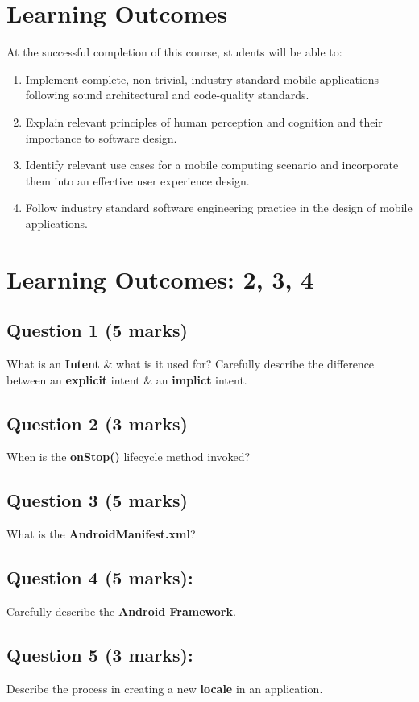 \documentclass{article}
\begin{document}
\section*{Learning Outcomes}
At the successful completion of this course, students will be able to:
\begin{enumerate}
	\item Implement complete, non-trivial, industry-standard mobile applications following sound architectural and code-quality standards.
	\item Explain relevant principles of human perception and cognition and their importance to software design.
	\item Identify relevant use cases for a mobile computing scenario and incorporate them into an effective user experience design.
	\item Follow industry standard software engineering practice in the design of mobile applications.
\end{enumerate}

\newpage

\section*{Learning Outcomes: 2, 3, 4}

\subsection*{Question 1 (5 marks)}
What is an \textbf{Intent} \& what is it used for? Carefully describe the difference between an \textbf{explicit} intent \& an \textbf{implict} intent.

\subsection*{Question 2 (3 marks)}
When is the \textbf{onStop()} lifecycle method invoked?

\subsection*{Question 3 (5 marks)}
What is the \textbf{AndroidManifest.xml}?

\subsection*{Question 4 (5 marks):}
Carefully describe the \textbf{Android Framework}.

\subsection*{Question 5 (3 marks):}
Describe the process in creating a new \textbf{locale} in an application.
\end{document}
